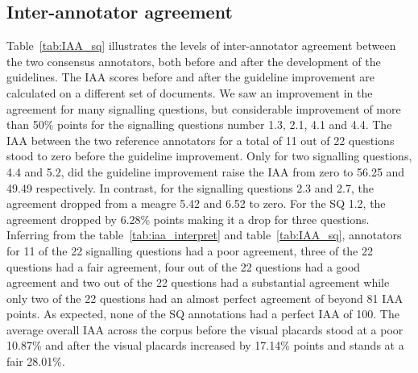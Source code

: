\documentclass[sn-mathphys,Numbered]{sn-jnl}%
\theoremstyle{thmstyleone}%
\theoremstyle{thmstyletwo}%
\theoremstyle{thmstylethree}%
\begin{document}
%
%
%
\subsection{Inter-annotator agreement}
%
Table~\ref{tab:IAA_sq} illustrates the levels of inter-annotator agreement between the two consensus annotators, both before and after the development of the guidelines.
The IAA scores before and after the guideline improvement are calculated on a different set of documents.
We saw an improvement in the agreement for many signalling questions, but considerable improvement of more than 50\% points for the signalling questions number 1.3, 2.1, 4.1 and 4.4.
The IAA between the two reference annotators for a total of 11 out of 22 questions stood to zero before the guideline improvement.
Only for two signalling questions, 4.4 and 5.2, did the guideline improvement raise the IAA from zero to 56.25 and 49.49 respectively.
In contrast, for the signalling questions 2.3 and 2.7, the agreement dropped from a meagre 5.42 and 6.52 to zero.
For the SQ 1.2, the agreement dropped by 6.28\% points making it a drop for three questions.
Inferring from the table~\ref{tab:iaa_interpret} and table~\ref{tab:IAA_sq}, annotators for 11 of the 22 signalling questions had a poor agreement, three of the 22 questions had a fair agreement, four out of the 22 questions had a good agreement and two out of the 22 questions had a substantial agreement while only two of the 22 questions had an almost perfect agreement of beyond 81 IAA points.
As expected, none of the SQ annotations had a perfect IAA of 100.
The average overall IAA across the corpus before the visual placards stood at a poor 10.87\% and after the visual placards increased by 17.14\% points and stands at a fair 28.01\%.
%
%
%
\end{document}

